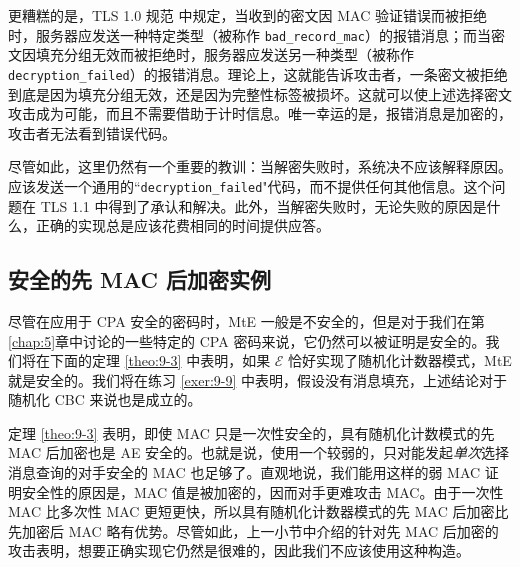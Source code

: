 \begin{snote}[信息性报错消息。]
更糟糕的是，TLS 1.0 规范 \cite{dierks1999rfc2246} 中规定，当收到的密文因 MAC 验证错误而被拒绝时，服务器应发送一种特定类型（被称作 \texttt{bad\_record\_mac}）的报错消息；而当密文因填充分组无效而被拒绝时，服务器应发送另一种类型（被称作 \texttt{decryption\_failed}）的报错消息。理论上，这就能告诉攻击者，一条密文被拒绝到底是因为填充分组无效，还是因为完整性标签被损坏。这就可以使上述选择密文攻击成为可能，而且不需要借助于计时信息。唯一幸运的是，报错消息是加密的，攻击者无法看到错误代码。

尽管如此，这里仍然有一个重要的教训：当解密失败时，系统决不应该解释原因。应该发送一个通用的``\texttt{decryption\_failed}"代码，而不提供任何其他信息。这个问题在 TLS 1.1 中得到了承认和解决。此外，当解密失败时，无论失败的原因是什么，正确的实现总是应该花费相同的时间提供应答。
\end{snote}

\subsection{安全的先 MAC 后加密实例}\label{subsec:9-4-4}

尽管在应用于 CPA 安全的密码时，MtE 一般是不安全的，但是对于我们在第\ref{chap:5}章中讨论的一些特定的 CPA 密码来说，它仍然可以被证明是安全的。我们将在下面的定理 \ref{theo:9-3} 中表明，如果 $\mathcal{E}$ 恰好实现了随机化计数器模式，MtE 就是安全的。我们将在练习 \ref{exer:9-9} 中表明，假设没有消息填充，上述结论对于随机化 CBC 来说也是成立的。

定理 \ref{theo:9-3} 表明，即使 MAC 只是一次性安全的，具有随机化计数模式的先 MAC 后加密也是 AE 安全的。也就是说，使用一个较弱的，只对能发起\emph{单次}选择消息查询的对手安全的 MAC 也足够了。直观地说，我们能用这样的弱 MAC 证明安全性的原因是，MAC 值是被加密的，因而对手更难攻击 MAC。由于一次性 MAC 比多次性 MAC 更短更快，所以具有随机化计数器模式的先 MAC 后加密比先加密后 MAC 略有优势。尽管如此，上一小节中介绍的针对先 MAC 后加密的攻击表明，想要正确实现它仍然是很难的，因此我们不应该使用这种构造。

